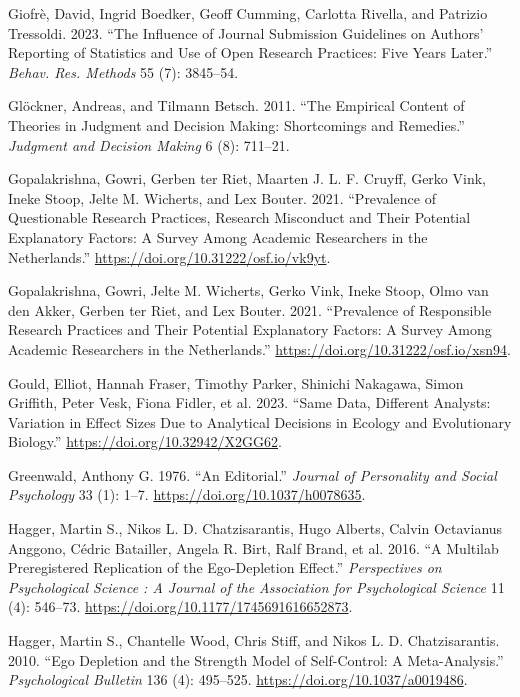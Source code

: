 \documentclass[
  letterpaper,
  DIV=11,
  numbers=noendperiod]{scrreprt}
\newlength{\cslhangindent}
\newenvironment{CSLReferences}[2] %
 {\begin{list}{}{%
  \setlength{\itemindent}{0pt}
  \setlength{\leftmargin}{0pt}
  \setlength{\parsep}{0pt}
  \ifodd #1
   \setlength{\leftmargin}{\cslhangindent}
   \setlength{\itemindent}{-1\cslhangindent}
  \fi
  \setlength{\itemsep}{#2\baselineskip}}}
 {\end{list}}
\begin{document}
\begin{CSLReferences}{1}{0}
Giofrè, David, Ingrid Boedker, Geoff Cumming, Carlotta Rivella, and
Patrizio Tressoldi. 2023. {``The Influence of Journal Submission
Guidelines on Authors' Reporting of Statistics and Use of Open Research
Practices: Five Years Later.''} \emph{Behav. Res. Methods} 55 (7):
3845--54.

Glöckner, Andreas, and Tilmann Betsch. 2011. {``The Empirical Content of
Theories in Judgment and Decision Making: Shortcomings and Remedies.''}
\emph{Judgment and Decision Making} 6 (8): 711--21.

Gopalakrishna, Gowri, Gerben ter Riet, Maarten J. L. F. Cruyff, Gerko
Vink, Ineke Stoop, Jelte M. Wicherts, and Lex Bouter. 2021.
{``Prevalence of Questionable Research Practices, Research Misconduct
and Their Potential Explanatory Factors: A Survey Among Academic
Researchers in the Netherlands.''}
\url{https://doi.org/10.31222/osf.io/vk9yt}.

Gopalakrishna, Gowri, Jelte M. Wicherts, Gerko Vink, Ineke Stoop, Olmo
van den Akker, Gerben ter Riet, and Lex Bouter. 2021. {``Prevalence of
Responsible Research Practices and Their Potential Explanatory Factors:
A Survey Among Academic Researchers in the Netherlands.''}
\url{https://doi.org/10.31222/osf.io/xsn94}.

Gould, Elliot, Hannah Fraser, Timothy Parker, Shinichi Nakagawa, Simon
Griffith, Peter Vesk, Fiona Fidler, et al. 2023. {``Same Data, Different
Analysts: Variation in Effect Sizes Due to Analytical Decisions in
Ecology and Evolutionary Biology.''}
\url{https://doi.org/10.32942/X2GG62}.

Greenwald, Anthony G. 1976. {``An Editorial.''} \emph{Journal of
Personality and Social Psychology} 33 (1): 1--7.
\url{https://doi.org/10.1037/h0078635}.

Hagger, Martin S., Nikos L. D. Chatzisarantis, Hugo Alberts, Calvin
Octavianus Anggono, Cédric Batailler, Angela R. Birt, Ralf Brand, et al.
2016. {``A Multilab Preregistered Replication of the Ego-Depletion
Effect.''} \emph{Perspectives on Psychological Science : A Journal of
the Association for Psychological Science} 11 (4): 546--73.
\url{https://doi.org/10.1177/1745691616652873}.

Hagger, Martin S., Chantelle Wood, Chris Stiff, and Nikos L. D.
Chatzisarantis. 2010. {``Ego Depletion and the Strength Model of
Self-Control: A Meta-Analysis.''} \emph{Psychological Bulletin} 136 (4):
495--525. \url{https://doi.org/10.1037/a0019486}.


\end{CSLReferences}
\end{document}
